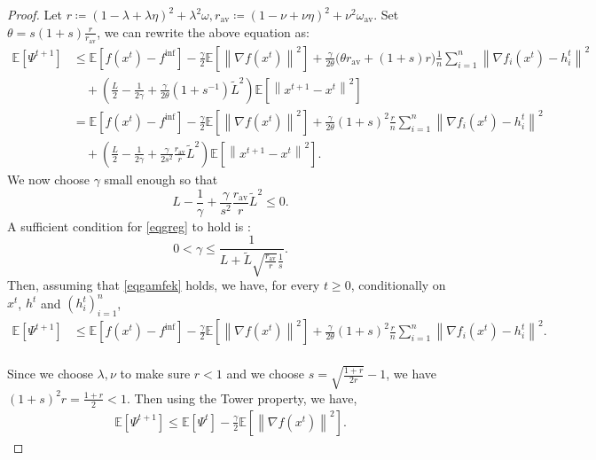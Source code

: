 \documentclass{article} %
\newcommand{\eqdef}{\coloneqq}
\theoremstyle{plain}
\theoremstyle{definition}
\theoremstyle{remark}
\newcommand{\sqnorm}[1]{\left\| #1 \right\|^2}
\newcommand{\Exp}[1]{\mathbb{E}\!\left[ #1 \right]}
\newcommand{\oma}{\omega_{\mathrm{av}}}
\begin{document}
\begin{proof}
   Let $r \eqdef (1 - \lambda + \lambda \eta)^2 + \lambda^2 \omega, r_{\mathrm{av}}\eqdef (1 - \nu + \nu\eta)^2 + \nu^2 \oma$. Set $\theta = s(1+s)\frac{r}{r_{\mathrm{av}}}$, we can rewrite the above equation as:
   \begin{align*}
   \Exp{\Psi^{t+1}} &\leq \Exp{f(x^t) - f^{\inf}} - \frac{\gamma}{2} \Exp{\sqnorm{\nabla f(x^t)}} +\frac{ \gamma }{2\theta}\Big( \theta r_{\mathrm{av}}
   +(1+s)r
   \Big) \frac{1}{n}\sum_{i=1}^n \sqnorm{\nabla f_i(x^t)-h_i^{t}}\\
   &\quad+ \left(\frac{ L}{2}-\frac{1}{2\gamma}+\frac{\gamma}{2\theta}(1+s^{-1})\tilde{L}^2\right)\!\Exp{\sqnorm{x^{t+1}-x^t}}\\
   &=\Exp{f(x^t) - f^{\inf}} - \frac{\gamma}{2} \Exp{\sqnorm{\nabla f(x^t)}} +\frac{ \gamma }{2\theta} (1+s)^2 
   \frac{r}{n}\sum_{i=1}^n \sqnorm{\nabla f_i(x^t)-h_i^{t}}\\
   &\quad+ \left(\frac{ L}{2}-\frac{1}{2\gamma}+\frac{\gamma}{2s^2}\frac{r_{\mathrm{av}}}{r}\tilde{L}^2\right)\!\Exp{\sqnorm{x^{t+1}-x^t}}.
   \end{align*}
   We now choose $\gamma$ small enough so that 
   \begin{equation}
   L-\frac{1}{\gamma}+\frac{\gamma}{s^2}\frac{r_{\mathrm{av}}}{r}\tilde{L}^2 \leq 0.\label{eqgreg}
   \end{equation}
   A sufficient condition for \eqref{eqgreg} to hold is \citep[Lemma 5]{ric21}:
   \begin{equation}
   0<\gamma \leq \frac{1}{L+\tilde{L}\sqrt{\frac{r_{\mathrm{av}}}{r}}\frac{1}{s}}.\label{eqgamfek}
   \end{equation}
   Then, assuming that \eqref{eqgamfek} holds, we have, for every $t\geq 0$, conditionally on $x^t$, $h^t$ and $(h_i^t)_{i=1}^n$,
   \begin{align*}
   \Exp{\Psi^{t+1}} &\leq \Exp{f(x^t) - f^{\inf}} - \frac{\gamma}{2} \Exp{\sqnorm{\nabla f(x^t)}} +\frac{ \gamma }{2\theta} (1+s)^2 
   \frac{r}{n}\sum_{i=1}^n \sqnorm{\nabla f_i(x^t)-h_i^{t}}.\\
   \end{align*}

   Since we choose $\lambda, \nu$ to make sure $r< 1$ and we choose $s = \sqrt{\frac{1+r}{2r}} - 1$, we have $(1+s)^2 r = \frac{1 + r}{2} < 1$. Then using the Tower property, we have,
   \begin{align*}
      \Exp{\Psi^{t+1}} \leq \Exp{\Psi^t} - \frac{\gamma}{2}\Exp{\sqnorm{\nabla f(x^t)}}.
   \end{align*}


\end{proof}
\end{document}
